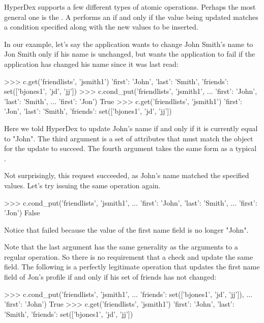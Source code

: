 HyperDex supports a few different types of atomic operations. Perhaps the most
general one is the .  A  performs an 
if and only if the value being updated matches a condition specified along with
the new values to be inserted.

In our example, let's say the application wants to change John Smith's name to
Jon Smith only if his name is unchanged, but wants the application to fail if
the application has changed his name since it was last read:

\begin{pythoncode}
>>> c.get('friendlists', 'jsmith1')
{'first': 'John', 'last': 'Smith', 'friends': set(['bjones1', 'jd', 'jj'])}
>>> c.cond_put('friendlists', 'jsmith1',
...            {'first': 'John', 'last': 'Smith'},
...            {'first': 'Jon'})
True
>>> c.get('friendlists', 'jsmith1')
{'first': 'Jon', 'last': 'Smith', 'friends': set(['bjones1', 'jd', 'jj'])}
\end{pythoncode}

Here we told HyperDex to update John's name if and only if it is currently equal
to "John".  The third argument is a set of attributes that must match the object
for the update to succeed.  The fourth argument takes the same form as a typical
.

Not surprisingly, this request succeeded, as John's name matched the specified
values. Let's try issuing the same operation again.

\begin{pythoncode}
>>> c.cond_put('friendlists', 'jsmith1',
...            {'first': 'John', 'last': 'Smith'},
...            {'first': 'Jon'})
False
\end{pythoncode}

Notice that  failed because the value of the first name field is
no longer "John".

Note that the last argument has the same generality as the arguments to a
regular  operation. So there is no requirement that a 
check and update the same field. The following is a perfectly legitimate
operation that updates the first name field of Jon's profile if and only if his
set of friends has not changed:

\begin{pythoncode}
>>> c.cond_put('friendlists', 'jsmith1',
...            {'friends': set(['bjones1', 'jd', 'jj'])},
...            {'first': 'John'})
True
>>> c.get('friendlists', 'jsmith1')
{'first': 'John', 'last': 'Smith', 'friends': set(['bjones1', 'jd', 'jj'])}
\end{pythoncode}

